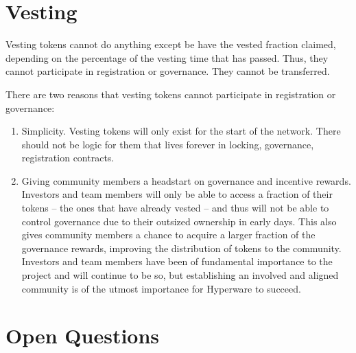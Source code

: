 \documentclass{article}
\begin{document}
\section{Vesting}\label{sec:vesting}

Vesting tokens cannot do anything except be have the vested fraction claimed, depending on the percentage of the vesting time that has passed.
Thus, they cannot participate in registration or governance.
They cannot be transferred.

There are two reasons that vesting tokens cannot participate in registration or governance:
\begin{enumerate}
    \item Simplicity.
         Vesting tokens will only exist for the start of the network.
         There should not be logic for them that lives forever in locking, governance, registration contracts.
    \item Giving community members a headstart on governance and incentive rewards.
         Investors and team members will only be able to access a fraction of their tokens -- the ones that have already vested -- and thus will not be able to control governance due to their outsized ownership in early days.
         This also gives community members a chance to acquire a larger fraction of the governance rewards, improving the distribution of tokens to the community.
         Investors and team members have been of fundamental importance to the project and will continue to be so, but establishing an involved and aligned community is of the utmost importance for Hyperware to succeed.
\end{enumerate}

\section{Open Questions}\label{sec:questions}
\end{document}
